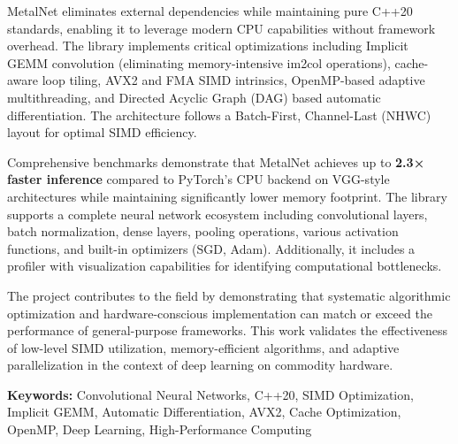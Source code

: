 \documentclass[12pt,oneside,a4paper]{report}
\begin{document}
MetalNet eliminates external dependencies while maintaining pure C++20 standards, enabling it to leverage modern CPU capabilities without framework overhead. The library implements critical optimizations including Implicit GEMM convolution (eliminating memory-intensive im2col operations), cache-aware loop tiling, AVX2 and FMA SIMD intrinsics, OpenMP-based adaptive multithreading, and Directed Acyclic Graph (DAG) based automatic differentiation. The architecture follows a Batch-First, Channel-Last (NHWC) layout for optimal SIMD efficiency.

Comprehensive benchmarks demonstrate that MetalNet achieves up to \textbf{2.3× faster inference} compared to PyTorch's CPU backend on VGG-style architectures while maintaining significantly lower memory footprint. The library supports a complete neural network ecosystem including convolutional layers, batch normalization, dense layers, pooling operations, various activation functions, and built-in optimizers (SGD, Adam). Additionally, it includes a profiler with visualization capabilities for identifying computational bottlenecks.

The project contributes to the field by demonstrating that systematic algorithmic optimization and hardware-conscious implementation can match or exceed the performance of general-purpose frameworks. This work validates the effectiveness of low-level SIMD utilization, memory-efficient algorithms, and adaptive parallelization in the context of deep learning on commodity hardware.

\vspace{1cm}

\noindent \textbf{Keywords:} Convolutional Neural Networks, C++20, SIMD Optimization, Implicit GEMM, Automatic Differentiation, AVX2, Cache Optimization, OpenMP, Deep Learning, High-Performance Computing

\newpage

\renewcommand{\contentsname}{\centerline{\textbf{TABLE OF CONTENTS}}}

\renewcommand{\cftchappresnum}{CHAPTER }
\renewcommand{\cftchapaftersnum}{ --}
\setlength{\cftchapnumwidth}{4.5cm}

\tableofcontents
{}
\setcounter{page}{1}

\newpage
\end{document}
